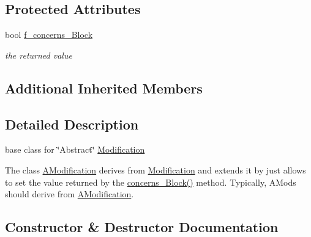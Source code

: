 \subsection*{Protected Attributes}
\begin{DoxyCompactItemize}
\item 
\mbox{\label{class_s_m_spp__di__unipi__it_1_1_a_modification_a38ac329b70398f9ac0c411033c89d4f9}} 
bool \mbox{\hyperlink{class_s_m_spp__di__unipi__it_1_1_a_modification_a38ac329b70398f9ac0c411033c89d4f9}{f\+\_\+concerns\+\_\+\+Block}}
\begin{DoxyCompactList}\small\item\em the returned value \end{DoxyCompactList}\end{DoxyCompactItemize}
\subsection*{Additional Inherited Members}


\subsection{Detailed Description}
base class for \char`\"{}\+Abstract\char`\"{} \mbox{\hyperlink{class_s_m_spp__di__unipi__it_1_1_modification}{Modification}} 

The class \mbox{\hyperlink{class_s_m_spp__di__unipi__it_1_1_a_modification}{A\+Modification}} derives from \mbox{\hyperlink{class_s_m_spp__di__unipi__it_1_1_modification}{Modification}} and extends it by just allows to set the value returned by the \mbox{\hyperlink{class_s_m_spp__di__unipi__it_1_1_modification_a22fe0cccfc755cfd89b240587d1f1cad}{concerns\+\_\+\+Block()}} method. Typically, A\+Mods should derive from \mbox{\hyperlink{class_s_m_spp__di__unipi__it_1_1_a_modification}{A\+Modification}}. 

\subsection{Constructor \& Destructor Documentation}
\mbox{\label{class_s_m_spp__di__unipi__it_1_1_a_modification_a6e08dbd2ad38d75f432eba5188d5c291}} 
